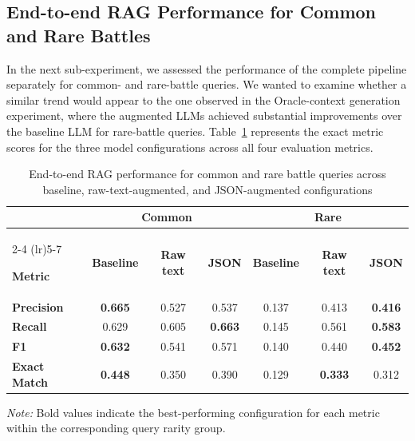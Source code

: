 \subsection{End-to-end RAG Performance for Common and Rare Battles}
In the next sub-experiment, we assessed the performance of the complete pipeline separately for common- and rare-battle queries. We wanted to examine whether a similar trend would appear to the one observed in the Oracle-context generation experiment, where the augmented LLMs achieved substantial improvements over the baseline LLM for rare-battle queries. Table~\ref{tab:e2e_common_rare} represents the exact metric scores for the three model configurations across all four evaluation metrics.
\begin{table}[H]
    \centering
    \caption{End-to-end RAG performance for common and rare battle queries across baseline, raw-text-augmented, and JSON-augmented configurations}
    \label{tab:e2e_common_rare}

    \small
    \renewcommand{\arraystretch}{1.4}
    \setlength{\tabcolsep}{6pt}

    \begin{tabular}{l ccc ccc}
        \toprule
        & \multicolumn{3}{c}{\textbf{Common}}
        & \multicolumn{3}{c}{\textbf{Rare}} \\
        \cmidrule(lr){2-4}
        \cmidrule(lr){5-7}

        \textbf{Metric} &
        \textbf{Baseline} &
        \textbf{Raw text} &
        \textbf{JSON} &
        \textbf{Baseline} &
        \textbf{Raw text} &
        \textbf{JSON} \\
        \midrule

        \textbf{Precision} &
        \textbf{0.665} & 0.527 & 0.537 &
        0.137 & 0.413 & \textbf{0.416} \\

        \textbf{Recall} &
        0.629 & 0.605 & \textbf{0.663} &
        0.145 & 0.561 & \textbf{0.583} \\

        \textbf{F1} &
        \textbf{0.632} & 0.541 & 0.571 &
        0.140 & 0.440 & \textbf{0.452} \\

        \textbf{Exact Match} &
        \textbf{0.448} & 0.350 & 0.390 &
        0.129 & \textbf{0.333} & 0.312 \\

        \bottomrule
    \end{tabular}

    \par\vspace{4pt}
    \begin{minipage}{\linewidth}
        \footnotesize
        \textit{Note:} Bold values indicate the
        best-performing configuration for each metric
        within the corresponding query rarity group.
    \end{minipage}

\end{table}
